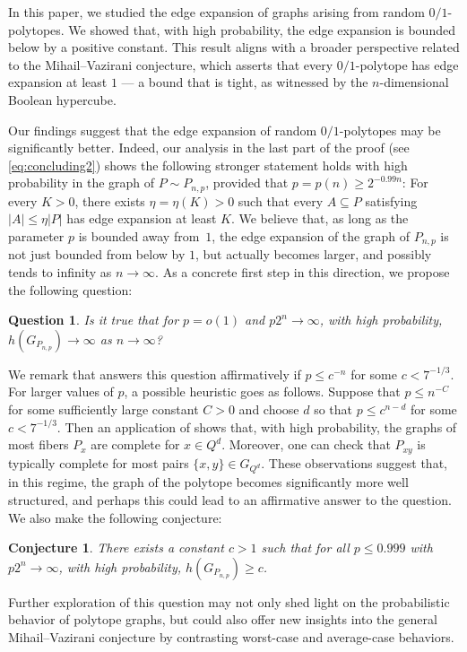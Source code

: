 \documentclass[11pt,a4paper,oneside,reqno]{amsart}
\newtheorem{conjecture}[theorem]{Conjecture}
\newtheorem{question}[theorem]{Question}
\begin{document}
In this paper, we studied the edge expansion of graphs arising from random $0/1$-polytopes. We showed that, with high probability, the edge expansion is bounded below by a positive constant. This result aligns with a broader perspective related to the Mihail--Vazirani conjecture, which asserts that every $0/1$-polytope has edge expansion at least $1$ --- a bound that is tight, as witnessed by the $n$-dimensional Boolean hypercube.

Our findings suggest that the edge expansion of random $0/1$-polytopes may be significantly better.  Indeed, our analysis in the last part of the proof (see \eqref{eq:concluding2}) shows the following stronger statement holds with high probability in the graph of $P \sim P_{n,p}$, provided that $p = p(n) \ge 2^{-0.99n}$: For every $K>0$, there exists $\eta = \eta(K)>0$ such that every $A \subseteq P$ satisfying $|A|\leq \eta|P|$ has edge expansion at least $K$. We believe that, as long as the parameter $p$ is bounded away from~$1$, the edge expansion of the graph of $P_{n,p}$ is not just bounded from below by $1$, but actually becomes larger, and possibly tends to infinity as $n \to \infty$.
As a concrete first step in this direction, we propose the following question:

\begin{question}
  Is it true that for \( p = o(1) \) and $p 2^n\rightarrow \infty$, with high probability, \( h(G_{P_{n,p}}) \to \infty \) as \( n \to \infty \)?
\end{question}

We remark that  answers this question affirmatively if $p \le c^{-n}$ for some $c < 7^{-1/3}$. For larger values of $p$, a possible heuristic goes as follows. Suppose that $p \le n^{-C}$ for some sufficiently large constant $C>0$ and choose $d$ so that $p \le c^{n-d}$ for some $c<7^{-1/3}$. Then an application of  shows that, with high probability, the graphs of most fibers $P_x$ are complete for $x\in Q^d$. Moreover, one can check that $P_{xy}$ is typically complete for most pairs $\{x,y\}\in G_{Q^d}$. These observations suggest that, in this regime, the graph of the polytope becomes significantly more well structured, and perhaps this could lead to an affirmative answer to the question. We also make the following conjecture:

\begin{conjecture}
  There exists a constant \( c > 1 \) such that for all \( p \leq 0.999 \) with $p2^n\rightarrow \infty$, with high probability, \( h(G_{P_{n,p}}) \geq c \).
\end{conjecture}

Further exploration of this question may not only shed light on the probabilistic behavior of polytope graphs, but could also offer new insights into the general Mihail--Vazirani conjecture by contrasting worst-case and average-case behaviors.



\end{document}
